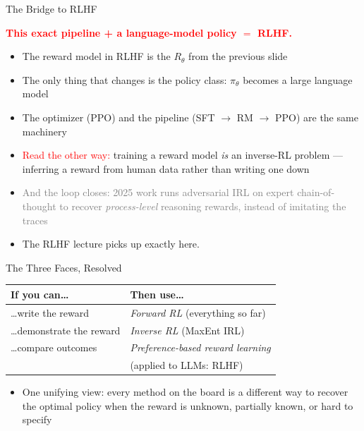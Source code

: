 \begin{frame}{The Bridge to RLHF}
\vspace{0.6em}
\begin{center}
\textcolor{red}{\textbf{This exact pipeline + a language-model policy $=$ RLHF.}}
\end{center}
\vspace{0.9em}
\begin{itemize}
    \setlength{\itemsep}{0.65em}
    \item The reward model in RLHF is the $R_\theta$ from the previous slide
    \item The only thing that changes is the policy class: $\pi_\theta$ becomes a large language model
    \item The optimizer (PPO) and the pipeline (SFT $\to$ RM $\to$ PPO) are the same machinery
    \item \textcolor{red}{Read the other way:} training a reward model \emph{is} an inverse-RL problem --- inferring a reward from human data rather than writing one down
    \item \textcolor{gray}{And the loop closes: 2025 work runs adversarial IRL on expert chain-of-thought to recover \emph{process-level} reasoning rewards, instead of imitating the traces}
    \item The RLHF lecture picks up exactly here.
\end{itemize}
\end{frame}

\begin{frame}{The Three Faces, Resolved}
\begin{center}
\renewcommand{\arraystretch}{1.6}
\small
\begin{tabular}{p{}p{}}
\hline
\textbf{If you can\ldots} & \textbf{Then use\ldots} \\
\hline
\ldots write the reward & \emph{Forward RL} (everything so far) \\
\ldots demonstrate the reward & \emph{Inverse RL} (MaxEnt IRL) \\
\ldots compare outcomes & \emph{Preference-based reward learning} \\
                       & (applied to LLMs: RLHF) \\
\hline
\end{tabular}
\end{center}
\vspace{1em}
\begin{itemize}
    \item One unifying view: every method on the board is a different way to recover the optimal policy when the reward is unknown, partially known, or hard to specify
\end{itemize}
\end{frame}
